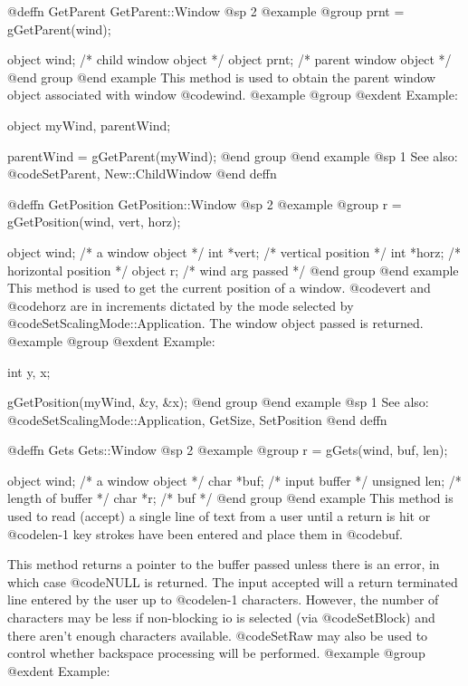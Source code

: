 @deffn {GetParent} GetParent::Window
@sp 2
@example
@group
prnt = gGetParent(wind);

object  wind;   /*  child window object   */
object  prnt;   /*  parent window object  */
@end group
@end example
This method is used to obtain the parent window object associated
with window @code{wind}.
@example
@group
@exdent Example:

object  myWind, parentWind;

parentWind = gGetParent(myWind);
@end group
@end example
@sp 1
See also:  @code{SetParent, New::ChildWindow}
@end deffn















@deffn {GetPosition} GetPosition::Window
@sp 2
@example
@group
r = gGetPosition(wind, vert, horz);

object  wind;   /*  a window object     */
int    *vert;   /*  vertical position   */
int    *horz;   /*  horizontal position */
object  r;      /*  wind arg passed     */
@end group
@end example
This method is used to get the current position of a window.
@code{vert} and @code{horz} are in increments dictated by the
mode selected by @code{SetScalingMode::Application}.  The window
object passed is returned.
@example
@group
@exdent Example:

int     y, x;

gGetPosition(myWind, &y, &x);
@end group
@end example
@sp 1
See also:  @code{SetScalingMode::Application, GetSize, SetPosition}
@end deffn







@deffn {Gets} Gets::Window
@sp 2
@example
@group
r = gGets(wind, buf, len);

object   wind;  /*  a window object       */
char    *buf;   /*  input buffer          */
unsigned len;   /*  length of buffer      */
char    *r;     /*  buf                   */
@end group
@end example
This method is used to read (accept) a single line of text from a user
until a return is hit or @code{len}-1 key strokes have been entered
and place them in @code{buf}.

This method returns a pointer to the buffer passed unless there is an
error, in which case @code{NULL} is returned.
The input accepted will a return terminated line entered by the user
up to @code{len}-1 characters.  However, the number of characters
may be less if non-blocking
io is selected (via @code{SetBlock}) and there aren't enough characters
available.  @code{SetRaw} may also be used to control whether backspace
processing will be performed.
@example
@group
@exdent Example:

